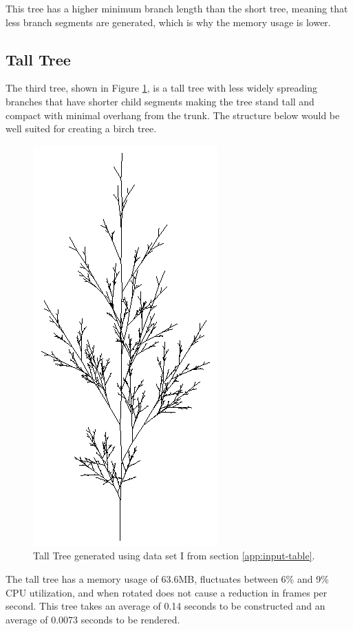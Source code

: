 \documentclass[final]{cmpreport}
\begin{document}
This tree has a higher minimum branch length than the short tree, meaning that less branch 
segments are generated, which is why the memory usage is lower.

\pagebreak
\subsection{Tall Tree}
The third tree, shown in Figure \ref{fig:tree-i}, is a tall tree with less widely spreading 
branches that have shorter child segments making the tree stand tall and compact with minimal 
overhang from the trunk. The structure below would be well suited for creating a birch tree.

\begin{figure}[ht]
    \includegraphics[scale=0.7]{tree-i.PNG} 
    \centering
    \captionsetup{justification=centering}
    \caption{Tall Tree generated using data set I from section \ref{app:input-table}.}
    \label{fig:tree-i}
\end{figure}

The tall tree has a memory usage of 63.6MB, fluctuates between 6\% and 9\% 
CPU utilization, and when rotated does not cause a reduction in frames per second. This tree takes 
an average of 0.14 seconds to be constructed and an average of 0.0073 seconds to be rendered.
\end{document}
